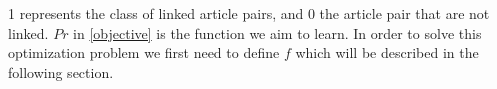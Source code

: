 1 represents the class of linked article pairs, and 0 the article pair that are not linked. $Pr$ in \cref{objective} is the function we aim to learn. In order to solve this optimization problem we first need to define $f$ which will be described in the following section.

 






